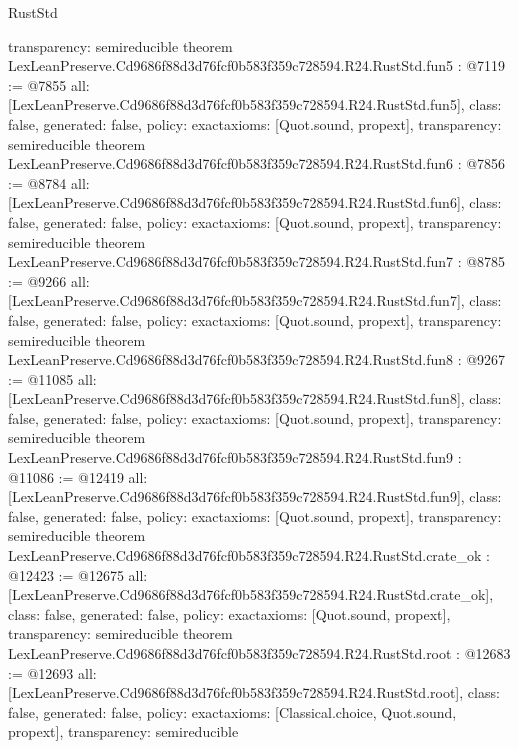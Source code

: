 \begin{lexlean}{RustStd}
\begin{coremodule}
{  transparency: semireducible
}
theorem LexLeanPreserve.Cd9686f88d3d76fcf0b583f359c728594.R24.RustStd.fun5 : @7119 := @7855 {
  all: [LexLeanPreserve.Cd9686f88d3d76fcf0b583f359c728594.R24.RustStd.fun5],
  class: false,
  generated: false,
  policy: exact{axioms: [Quot.sound, propext]},
  transparency: semireducible
}
theorem LexLeanPreserve.Cd9686f88d3d76fcf0b583f359c728594.R24.RustStd.fun6 : @7856 := @8784 {
  all: [LexLeanPreserve.Cd9686f88d3d76fcf0b583f359c728594.R24.RustStd.fun6],
  class: false,
  generated: false,
  policy: exact{axioms: [Quot.sound, propext]},
  transparency: semireducible
}
theorem LexLeanPreserve.Cd9686f88d3d76fcf0b583f359c728594.R24.RustStd.fun7 : @8785 := @9266 {
  all: [LexLeanPreserve.Cd9686f88d3d76fcf0b583f359c728594.R24.RustStd.fun7],
  class: false,
  generated: false,
  policy: exact{axioms: [Quot.sound, propext]},
  transparency: semireducible
}
theorem LexLeanPreserve.Cd9686f88d3d76fcf0b583f359c728594.R24.RustStd.fun8 : @9267 := @11085 {
  all: [LexLeanPreserve.Cd9686f88d3d76fcf0b583f359c728594.R24.RustStd.fun8],
  class: false,
  generated: false,
  policy: exact{axioms: [Quot.sound, propext]},
  transparency: semireducible
}
theorem LexLeanPreserve.Cd9686f88d3d76fcf0b583f359c728594.R24.RustStd.fun9 : @11086 := @12419 {
  all: [LexLeanPreserve.Cd9686f88d3d76fcf0b583f359c728594.R24.RustStd.fun9],
  class: false,
  generated: false,
  policy: exact{axioms: [Quot.sound, propext]},
  transparency: semireducible
}
theorem LexLeanPreserve.Cd9686f88d3d76fcf0b583f359c728594.R24.RustStd.crate_ok : @12423 := @12675 {
  all: [LexLeanPreserve.Cd9686f88d3d76fcf0b583f359c728594.R24.RustStd.crate_ok],
  class: false,
  generated: false,
  policy: exact{axioms: [Quot.sound, propext]},
  transparency: semireducible
}
theorem LexLeanPreserve.Cd9686f88d3d76fcf0b583f359c728594.R24.RustStd.root : @12683 := @12693 {
  all: [LexLeanPreserve.Cd9686f88d3d76fcf0b583f359c728594.R24.RustStd.root],
  class: false,
  generated: false,
  policy: exact{axioms: [Classical.choice, Quot.sound, propext]},
  transparency: semireducible
}


\end{coremodule}
\end{lexlean}
